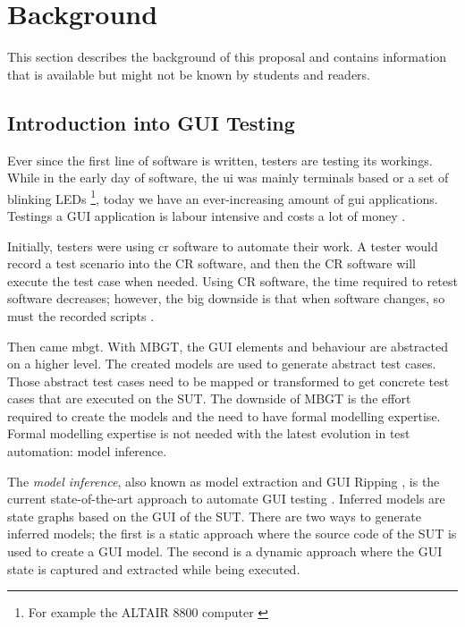 \chapter{Background} \label{background}


This section describes the background of this proposal and contains information that is available but might not be known by students and readers. 

\section{Introduction into GUI Testing}
Ever since the first line of software is written, testers are testing its workings. While in the early day of software, the \acrfull{ui} was mainly terminals based or a set of blinking LEDs \cite{altair8800} \footnote{For example the ALTAIR 8800 computer \cite{altair8800}}, today we have an ever-increasing amount of \acrfull{gui} applications. Testings a GUI application is labour intensive and costs a lot of money \cite{gui-history}.

Initially, testers were using \acrfull{cr} software to automate their work. A tester would record a test scenario into the CR software, and then the CR software will execute the test case when needed. Using CR software, the time required to retest software decreases; however, the big downside is that when software changes, so must the recorded scripts \cite{gui-history}.

Then came \acrfull{mbgt}. With MBGT, the GUI elements and behaviour are abstracted on a higher level. The created models are used to generate abstract test cases. Those abstract test cases need to be mapped or transformed to get concrete test cases that are executed on the SUT. The downside of MBGT is the effort required to create the models and the need to have formal modelling expertise. Formal modelling expertise is not needed with the latest evolution in test automation: model inference. 

The \emph{model inference}, also known as model extraction and GUI Ripping \cite{gui-ripping}, is the current state-of-the-art approach to automate GUI testing \cite{gui-history}. Inferred models are state graphs based on the GUI of the SUT. There are two ways to generate inferred models; the first is a static approach where the source code of the  SUT is used to create a GUI model. The second is a dynamic approach where the GUI state is captured and extracted while being executed. 

